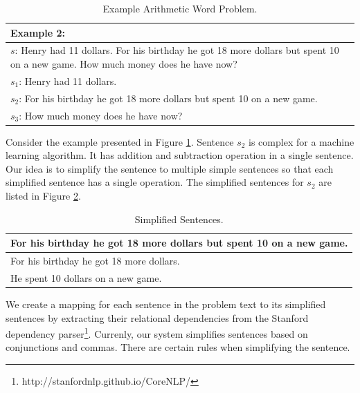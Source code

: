 \documentclass[11pt]{article}
\begin{document}
\begin{table}[h!]
\centering
\begin{tabular}{ | m{25em} | }
\hline
\textbf{Example 2:}\\
\hline
\begin{math}s\end{math}: Henry had 11 dollars. For his birthday he got 18 more dollars but spent 10 on a new game. How much money does he have now?\\
\hline
\begin{math}s_{1}\end{math}: Henry had 11 dollars.\\
\hline
\begin{math}s_{2}\end{math}: For his birthday he got 18 more dollars but spent 10 on a new game.\\
\hline
\begin{math}s_{3}\end{math}: How much money does he have now?\\
\hline
\end{tabular}
\caption{Example Arithmetic Word Problem.}
\label{figure:6}
\end{table}

Consider the example presented in Figure \ref{figure:6}. Sentence \begin{math}s_{2}\end{math} is complex for a machine learning algorithm. It has addition and subtraction operation in a single sentence. Our idea is to simplify the sentence to multiple simple sentences so that each simplified sentence has a single operation. The simplified sentences for \begin{math}s_{2}\end{math} are listed in Figure \ref{figure:7}.

\begin{table}[h!]
\centering
\begin{tabular}{ | m{25em} | }
\hline
 \textbf{For his birthday he got 18 more dollars but spent 10 on a new game.}\\
\hline
 For his birthday he got 18 more dollars.\\
\hline
He spent 10 dollars on a new game.\\
\hline
\end{tabular}
\caption{Simplified Sentences.}
\label{figure:7}
\end{table}

We create a mapping for each sentence in the problem text to its simplified sentences by extracting their relational dependencies from the Stanford dependency parser\footnote{http://stanfordnlp.github.io/CoreNLP/ }. Currenly, our system simplifies sentences based on conjunctions and commas. There are certain rules when simplifying the sentence.
\end{document}
